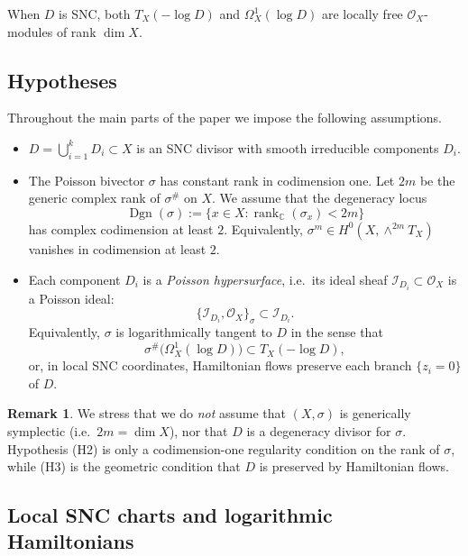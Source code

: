 \documentclass[11pt]{amsart}
\theoremstyle{plain}
\theoremstyle{definition}
\newtheorem{remark}[theorem]{Remark}
\DeclareMathOperator{\Dgn}{Dgn}
\theoremstyle{definition}
\newcommand{\C}{\mathbb{C}}
\newcommand{\OO}{\mathcal{O}}
\begin{document}
When $D$ is SNC, both $T_X(-\log D)$ and $\Omega^1_X(\log D)$ are locally free $\OO_X$-modules of rank $\dim X$.

\subsection{Hypotheses}

Throughout the main parts of the paper we impose the following assumptions.

\begin{itemize}
\item[(H1)] $D=\bigcup_{i=1}^k D_i\subset X$ is an SNC divisor with smooth irreducible components $D_i$.

\item[(H2)] The Poisson bivector $\sigma$ has constant rank in codimension one. Let $2m$ be the generic
complex rank of $\sigma^\#$ on $X$. We assume that the degeneracy locus
$$
\Dgn(\sigma) := \{x\in X : \operatorname{rank}_\C(\sigma_x) < 2m\}
$$
has complex codimension at least $2$. Equivalently, $\sigma^m \in H^0(X,\wedge^{2m}T_X)$ vanishes in codimension at least $2$.

\item[(H3)] Each component $D_i$ is a \emph{Poisson hypersurface}, i.e.\ its ideal sheaf $\mathcal{I}_{D_i}\subset\OO_X$
is a Poisson ideal:
$$
\{\mathcal{I}_{D_i},\OO_X\}_\sigma \subset \mathcal{I}_{D_i}.
$$
Equivalently, $\sigma$ is logarithmically tangent to $D$ in the sense that
$$
\sigma^\#\big(\Omega_X^1(\log D)\big)\subset T_X(-\log D),
$$
or, in local SNC coordinates, Hamiltonian flows preserve each branch $\{z_i=0\}$ of $D$.
\end{itemize}

\begin{remark}\label{rem:H2H3}
We stress that we do \emph{not} assume that $(X,\sigma)$ is generically symplectic (i.e.\ $2m=\dim X$), nor that
$D$ is a degeneracy divisor for $\sigma$. Hypothesis \textup{(H2)} is only a codimension-one regularity condition
on the rank of $\sigma$, while \textup{(H3)} is the geometric condition that $D$ is preserved by Hamiltonian flows.
\end{remark}

\subsection{Local SNC charts and logarithmic Hamiltonians}\label{lem:logHam}
\end{document}
